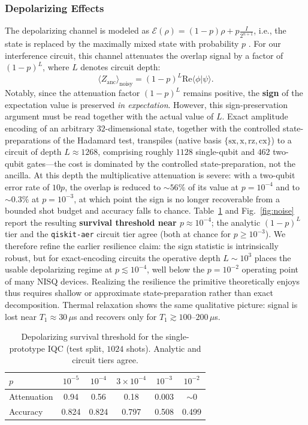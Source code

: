 \documentclass[conference]{IEEEtran}
\begin{document}
\subsubsection{Depolarizing Effects}
The depolarizing channel is modeled as $\mathcal{E}(\rho) = (1-p)\rho + p\frac{I}{2^{n+1}}$, i.e., the state is replaced by the maximally mixed state with probability $p$ \cite{nielsen2000qcqi}. For our interference circuit, this channel attenuates the overlap signal by a factor of $(1-p)^L$, where $L$ denotes circuit depth:
\begin{equation}
    \langle Z_{\text{anc}} \rangle_{\text{noisy}} = (1-p)^L \mathrm{Re}\langle \phi | \psi \rangle.
\end{equation}
Notably, since the attenuation factor $(1-p)^L$ remains positive, the \textbf{sign} of the expectation value is preserved \emph{in expectation}. However, this sign-preservation argument must be read together with the actual value of $L$. Exact amplitude encoding of an arbitrary $32$-dimensional state, together with the controlled state-preparations of the Hadamard test, transpiles (native basis $\{\mathrm{sx},\mathrm{x},\mathrm{rz},\mathrm{cx}\}$) to a circuit of depth $L\approx1268$, comprising roughly $1128$ single-qubit and $462$ two-qubit gates---the cost is dominated by the controlled state-preparation, not the ancilla. At this depth the multiplicative attenuation is severe: with a two-qubit error rate of $10p$, the overlap is reduced to $\sim\!56\%$ of its value at $p=10^{-4}$ and to $\sim\!0.3\%$ at $p=10^{-3}$, at which point the sign is no longer recoverable from a bounded shot budget and accuracy falls to chance. Table~\ref{tab:noise} and Fig.~\ref{fig:noise} report the resulting \textbf{survival threshold near $p\approx10^{-4}$}; the analytic $(1-p)^L$ tier and the \texttt{qiskit-aer} circuit tier agree (both at chance for $p\geq10^{-3}$). We therefore refine the earlier resilience claim: the sign statistic is intrinsically robust, but for exact-encoding circuits the operative depth $L\sim10^{3}$ places the usable depolarizing regime at $p\lesssim10^{-4}$, well below the $p=10^{-2}$ operating point of many NISQ devices. Realizing the resilience the primitive theoretically enjoys thus requires shallow or approximate state-preparation rather than exact decomposition. Thermal relaxation shows the same qualitative picture: signal is lost near $T_1\approx30\,\mu$s and recovers only for $T_1\gtrsim100$--$200\,\mu$s.

\begin{table}[ht]
\centering
\caption{Depolarizing survival threshold for the single-prototype IQC (test split, $1024$ shots). Analytic and circuit tiers agree.}
\label{tab:noise}
\begin{tabular}{l c c c c c}
\toprule
$p$ & $10^{-5}$ & $10^{-4}$ & $3\times10^{-4}$ & $10^{-3}$ & $10^{-2}$ \\
\midrule
Attenuation & 0.94 & 0.56 & 0.18 & 0.003 & $\sim\!0$ \\
Accuracy & 0.824 & 0.824 & 0.797 & 0.508 & 0.499 \\
\bottomrule
\end{tabular}
\end{table}
\end{document}

